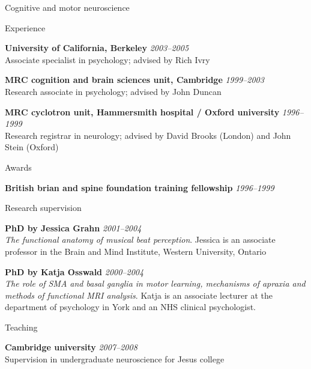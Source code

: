 \documentclass{cv}
\begin{document}
\begin{cvSection}{Cognitive and motor neuroscience}

\begin{cvSubSection}{Experience}

{\bf University of California, Berkeley} \hfill {\em 2003--2005 } \\
Associate specialist in psychology; advised by Rich Ivry

{\bf MRC cognition and brain sciences unit, Cambridge} \hfill {\em 1999--2003 } \\
Research associate in psychology; advised by John Duncan

{\bf MRC cyclotron unit, Hammersmith hospital / Oxford university}
\hfill {\em 1996--1999} \\
Research registrar in neurology; advised by David Brooks (London) and John
Stein (Oxford)

\end{cvSubSection}

\begin{cvSubSection}{Awards}

{\bf British brian and spine foundation training fellowship} \hfill {\em
1996--1999}

\end{cvSubSection}

\begin{cvSubSection}{Research supervision}

{\bf PhD by Jessica Grahn} \hfill {\em 2001--2004} \\
{\em The functional anatomy of musical beat perception}. Jessica is an
associate professor in the Brain and Mind Institute, Western University,
Ontario

{\bf PhD by Katja Osswald} \hfill {\em 2000--2004} \\
{\em The role of SMA and basal ganglia in motor learning, mechanisms of
apraxia and methods of functional MRI analysis}. Katja is an associate
lecturer at the department of psychology in York and an NHS clinical
psychologist.

\end{cvSubSection}

\begin{cvSubSection}{Teaching}

{\bf Cambridge university} \hfill {\em 2007--2008} \\
Supervision in undergraduate neuroscience for Jesus college

\end{cvSubSection}


\end{cvSection}
\end{document}
